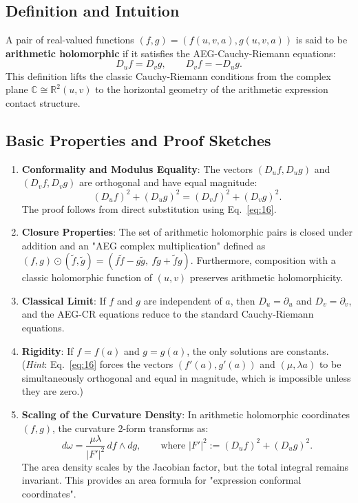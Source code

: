 
\subsection{Definition and Intuition}
A pair of real-valued functions $(f,g)=(f(u,v,a),g(u,v,a))$ is said to be \textbf{arithmetic holomorphic} if it satisfies the AEG-Cauchy-Riemann equations:
\begin{equation}\label{eq:16}\tag{16}
D_u f=D_v g,\qquad D_v f=-D_u g.
\end{equation}
This definition lifts the classic Cauchy-Riemann conditions from the complex plane $\mathbb{C} \cong \mathbb{R}^2(u,v)$ to the horizontal geometry of the arithmetic expression contact structure.

\subsection{Basic Properties and Proof Sketches}
\begin{enumerate}
    \item \textbf{Conformality and Modulus Equality}: The vectors $(D_uf,D_ug)$ and $(D_vf,D_vg)$ are orthogonal and have equal magnitude:
    \[
    (D_uf)^2+(D_ug)^2=(D_vf)^2+(D_vg)^2.
    \]
    The proof follows from direct substitution using Eq.~\eqref{eq:16}.

    \item \textbf{Closure Properties}: The set of arithmetic holomorphic pairs is closed under addition and an "AEG complex multiplication" defined as $(f,g)\odot(\tilde f,\tilde g)=(f\tilde f- g\tilde g,\ f\tilde g+\tilde f g)$. Furthermore, composition with a classic holomorphic function of $(u,v)$ preserves arithmetic holomorphicity.

    \item \textbf{Classical Limit}: If $f$ and $g$ are independent of $a$, then $D_u=\partial_u$ and $D_v=\partial_v$, and the AEG-CR equations reduce to the standard Cauchy-Riemann equations.

    \item \textbf{Rigidity}: If $f=f(a)$ and $g=g(a)$, the only solutions are constants. (\textit{Hint}: Eq.~\eqref{eq:16} forces the vectors $(f'(a), g'(a))$ and $(\mu, \lambda a)$ to be simultaneously orthogonal and equal in magnitude, which is impossible unless they are zero.)

    \item \textbf{Scaling of the Curvature Density}: In arithmetic holomorphic coordinates $(f,g)$, the curvature 2-form transforms as:
    \begin{equation}\label{eq:17}\tag{17}
    d\omega=\frac{\mu\lambda}{|F'|^2}\,df\wedge dg,\qquad \text{where } |F'|^2:=(D_uf)^2+(D_ug)^2.
    \end{equation}
    The area density scales by the Jacobian factor, but the total integral remains invariant. This provides an area formula for "expression conformal coordinates".
\end{enumerate}
